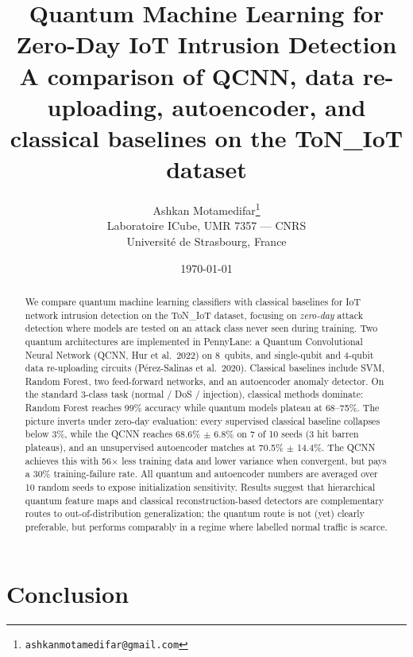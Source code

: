\documentclass[11pt,a4paper]{article}
\title{Quantum Machine Learning for Zero-Day IoT Intrusion Detection\\
\large A comparison of QCNN, data re-uploading, autoencoder, and classical baselines
on the ToN\_IoT dataset}
\author{Ashkan Motamedifar\thanks{\texttt{ashkanmotamedifar@gmail.com}}\\
Laboratoire ICube, UMR 7357 --- CNRS\\
Universit\'{e} de Strasbourg, France}
\date{\today}
\let\OldSection\section
\let\OldSubsection\subsection
\let\OldSubsubsection\subsubsection
\renewcommand{\section}[1]{\OldSubsection{#1}}
\renewcommand{\subsection}[1]{\OldSubsubsection{#1}}
\begin{document}
\maketitle

\begin{abstract}
We compare quantum machine learning classifiers with classical baselines
for IoT network intrusion detection on the ToN\_IoT dataset, focusing on
\emph{zero-day} attack detection where models are tested on an attack class
never seen during training. Two quantum architectures are implemented
in PennyLane: a Quantum Convolutional Neural Network (QCNN, Hur et al.\
2022) on 8~qubits, and single-qubit and 4-qubit data re-uploading circuits
(P\'erez-Salinas et al.\ 2020). Classical baselines include SVM, Random
Forest, two feed-forward networks, and an autoencoder anomaly detector.
On the standard 3-class task (normal / DoS / injection), classical methods
dominate: Random Forest reaches 99\% accuracy while quantum models plateau
at 68--75\%. The picture inverts under zero-day evaluation: every supervised
classical baseline collapses below 3\%, while the QCNN reaches 68.6\% $\pm$
6.8\% on 7 of 10 seeds (3 hit barren plateaus), and an unsupervised autoencoder
matches at 70.5\% $\pm$ 14.4\%. The QCNN achieves this with 56$\times$ less
training data and lower variance when convergent, but pays a 30\% training-failure
rate. All quantum and autoencoder numbers are averaged over 10 random seeds
to expose initialization sensitivity. Results suggest that hierarchical
quantum feature maps and classical reconstruction-based detectors are
complementary routes to out-of-distribution generalization; the quantum
route is not (yet) clearly preferable, but performs comparably in a
regime where labelled normal traffic is scarce.
\end{abstract}









\OldSection{Conclusion}
\label{sec:conclusion}\label{chap:conclusion}
\end{document}
